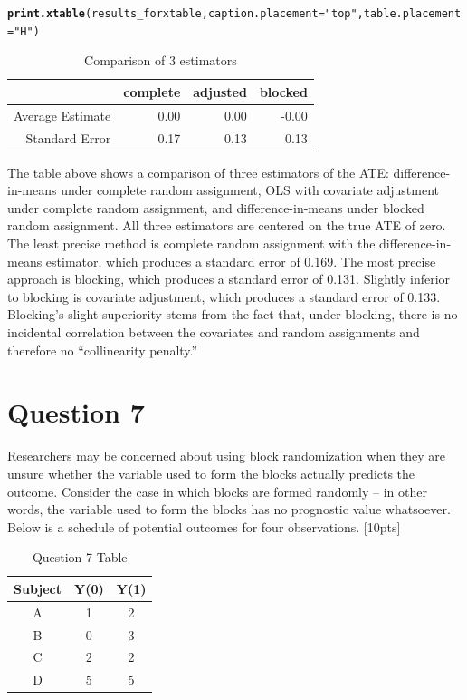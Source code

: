 \documentclass[11pt,notitlepage]{article}\usepackage[]{graphicx}\usepackage[]{color}
\makeatletter
\newcommand{\hlstr}[1]{\textcolor[rgb]{0.192,0.494,0.8}{#1}}%
\newcommand{\hlstd}[1]{\textcolor[rgb]{0.345,0.345,0.345}{#1}}%
\newcommand{\hlkwc}[1]{\textcolor[rgb]{0.333,0.667,0.333}{#1}}%
\newcommand{\hlkwd}[1]{\textcolor[rgb]{0.737,0.353,0.396}{\textbf{#1}}}%
\newenvironment{kframe}{%
 \def\at@end@of@kframe{}%
 \ifinner\ifhmode%
  \def\at@end@of@kframe{\end{minipage}}%
  \begin{minipage}{\columnwidth}%
 \fi\fi%
 \def\FrameCommand##1{\hskip\@totalleftmargin \hskip-\fboxsep
 \colorbox{shadecolor}{##1}\hskip-\fboxsep
     \hskip-\linewidth \hskip-\@totalleftmargin \hskip\columnwidth}%
 \MakeFramed {\advance\hsize-\width
   \@totalleftmargin\z@ \linewidth\hsize
   \@setminipage}}%
 {\par\unskip\endMakeFramed%
 \at@end@of@kframe}
\makeatother
\begin{document}
\begin{enumerate}[a)]
\begin{kframe}
\begin{alltt}
\hlkwd{print.xtable}\hlstd{(results_forxtable,}\hlkwc{caption.placement}\hlstd{=}\hlstr{"top"}\hlstd{,}\hlkwc{table.placement}\hlstd{=}\hlstr{"H"}\hlstd{)}
\end{alltt}
\end{kframe}%
\begin{table}[H]
\centering
\caption{Comparison of 3 estimators} 
\begin{tabular}{rrrr}
  \hline
 & complete & adjusted & blocked \\ 
  \hline
Average Estimate & 0.00 & 0.00 & -0.00 \\ 
  Standard Error & 0.17 & 0.13 & 0.13 \\ 
   \hline
\end{tabular}
\end{table}


The table above shows a comparison of three estimators of the ATE: difference-in-means under complete random assignment, OLS with covariate adjustment under complete random assignment, and difference-in-means under blocked random assignment. All three estimators are centered on the true ATE of zero. The least precise method is complete random assignment with the difference-in-means estimator, which produces a standard error of 0.169.  The most precise approach is blocking, which produces a standard error of 0.131.  Slightly inferior to blocking is covariate adjustment, which produces a standard error of 0.133. Blocking's slight superiority stems from the fact that, under blocking, there is no incidental correlation between the covariates and random assignments and therefore no ``collinearity penalty.''

\end{enumerate}

\section*{Question 7}
Researchers may be concerned about using block randomization when they are unsure whether the variable used to form the blocks actually predicts the outcome. Consider the case in which blocks are formed randomly -- in other words, the variable used to form the blocks has no prognostic value whatsoever. Below is a schedule of potential outcomes for four observations. [10pts]

\begin{table}[H]
  \centering
  \caption{Question 7 Table}
    \begin{tabular}{ccc}
    \toprule
    Subject & Y(0)  & Y(1) \\
    \midrule
    A     & 1     & 2 \\
    B     & 0     & 3 \\
    C     & 2     & 2 \\
    D     & 5     & 5 \\
    \bottomrule
    \end{tabular}%
  \label{tab:addlabel}%
\end{table}%
\end{document}
